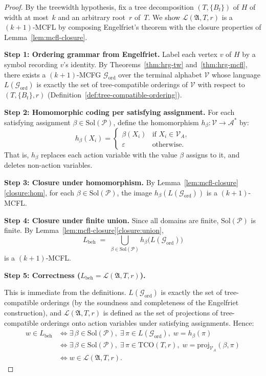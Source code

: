 \documentclass[runningheads]{llncs}
\begin{document}
\begin{proof}
By the treewidth hypothesis, fix a tree decomposition $(T, \{B_t\})$ of $H$ of width at most~$k$ and an arbitrary root~$r$ of~$T$.
We show $\mathcal{L}(\mathfrak{A}, T, r)$ is a $(k{+}1)$-MCFL by composing Engelfriet's theorem with the closure properties of Lemma~\ref{lem:mcfl-closure}.

\medskip
\noindent\textbf{Step 1: Ordering grammar from Engelfriet.}
Label each vertex $v$ of $H$ by a symbol recording $v$'s identity.
By Theorems~\ref{thm:hrg-tw} and~\ref{thm:hrg-mcfl}, there exists a $(k{+}1)$-MCFG $\mathcal{G}_{\mathrm{ord}}$ over the terminal alphabet $\mathcal{V}$ whose language $L(\mathcal{G}_{\mathrm{ord}})$ is exactly the set of tree-compatible orderings of $\mathcal{V}$ with respect to $(T, \{B_t\}, r)$ (Definition~\ref{def:tree-compatible-ordering}).

\medskip
\noindent\textbf{Step 2: Homomorphic coding per satisfying assignment.}
For each satisfying assignment $\beta \in \mathrm{Sol}(\mathcal{P})$, define the homomorphism $h_\beta\colon \mathcal{V} \to \mathcal{A}^*$ by:
\[
  h_\beta(X_i) = \begin{cases} \beta(X_i) & \text{if } X_i \in \mathcal{V}_A, \\ \varepsilon & \text{otherwise.} \end{cases}
\]
That is, $h_\beta$ replaces each action variable with the value $\beta$ assigns to it, and deletes non-action variables.

\medskip
\noindent\textbf{Step 3: Closure under homomorphism.}
By Lemma~\ref{lem:mcfl-closure}\ref{closure:hom}, for each $\beta \in \mathrm{Sol}(\mathcal{P})$, the image $h_\beta(L(\mathcal{G}_{\mathrm{ord}}))$ is a $(k{+}1)$-MCFL.

\medskip
\noindent\textbf{Step 4: Closure under finite union.}
Since all domains are finite, $\mathrm{Sol}(\mathcal{P})$ is finite.
By Lemma~\ref{lem:mcfl-closure}\ref{closure:union},
\[
  L_{\mathrm{beh}} \;=\; \bigcup_{\beta \in \mathrm{Sol}(\mathcal{P})} h_\beta\big(L(\mathcal{G}_{\mathrm{ord}})\big)
\]
is a $(k{+}1)$-MCFL.

\medskip
\noindent\textbf{Step 5: Correctness ($L_{\mathrm{beh}} = \mathcal{L}(\mathfrak{A}, T, r)$).}

This is immediate from the definitions.
$L(\mathcal{G}_{\mathrm{ord}})$ is exactly the set of tree-compatible orderings (by the soundness and completeness of the Engelfriet construction), and $\mathcal{L}(\mathfrak{A}, T, r)$ is defined as the set of projections of tree-compatible orderings onto action variables under satisfying assignments.
Hence:
\begin{align*}
  w \in L_{\mathrm{beh}} &\iff \exists\, \beta \in \mathrm{Sol}(\mathcal{P}),\; \exists\, \pi \in L(\mathcal{G}_{\mathrm{ord}}),\; w = h_\beta(\pi) \\
    &\iff \exists\, \beta \in \mathrm{Sol}(\mathcal{P}),\; \exists\, \pi \in \mathrm{TCO}(T, r),\; w = \mathrm{proj}_{\mathcal{V}_A}(\beta, \pi) \\
    &\iff w \in \mathcal{L}(\mathfrak{A}, T, r).
\end{align*}


\end{proof}
\end{document}
